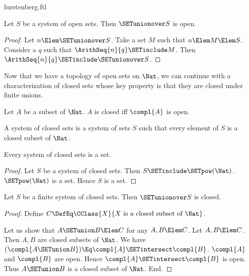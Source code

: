 \documentclass{stex}
\begin{document}
\begin{smodule}{furstenberg.ftl}
\begin{forthel}
  \begin{lemma}
    Let $S$ be a system of open sets.
    Then $\SETunionover S$ is open.
  \end{lemma}
  \begin{proof}
    Let $n \Elem \SETunionover S$.
    Take a set $M$ such that $n \Elem M \Elem S$.
    Consider a $q$ such that $\ArithSeq{n}{q} \SETinclude M$.
    Then $\ArithSeq{n}{q} \SETinclude \SETunionover S$.
  \end{proof}
\end{forthel}

Now that we have a topology of open sets on $\Nat$, we can continue
with a characterization of closed sets whose key property is that they are
closed under finite unions.

\begin{forthel}
  \begin{definition}[for=closed]
    Let $A$ be a subset of $\Nat$.
    $A$ is closed iff $\compl{A}$ is open.
  \end{definition}

  \begin{definition}[for=system of closed sets]
    A system of closed sets is a system of sets $S$ such that every element of
    $S$ is a closed subset of $\Nat$.
  \end{definition}

  \begin{lemma}
    Every system of closed sets is a set.
  \end{lemma}
  \begin{proof}
    Let $S$ be a system of closed sets.
    Then $S \SETinclude \SETpow(\Nat)$.
    $\SETpow(\Nat)$ is a set.
    Hence $S$ is a set.
  \end{proof}

  \begin{lemma}
    Let $S$ be a finite system of closed sets.
    Then $\SETunionover S$ is closed.
  \end{lemma}
  \begin{proof}
    Define $C \DefEq \CClass{X}{X \text{ is a closed subset of } \Nat}$.

    Let us show that $A \SETunion B \Elem C$ for any $A, B \Elem C$.
      Let $A, B \Elem C$.
      Then $A, B$ are closed subsets of $\Nat$.
      We have $(\compl{A \SETunion B}) \Eq \compl{A} \SETintersect \compl{B}$. %
      $\compl{A}$ and $\compl{B}$ are open.
      Hence $\compl{A} \SETintersect \compl{B}$ is open.
      Thus $A \SETunion B$ is a closed subset of $\Nat$.
    End.


\end{proof}
\end{forthel}
\end{smodule}
\end{document}
